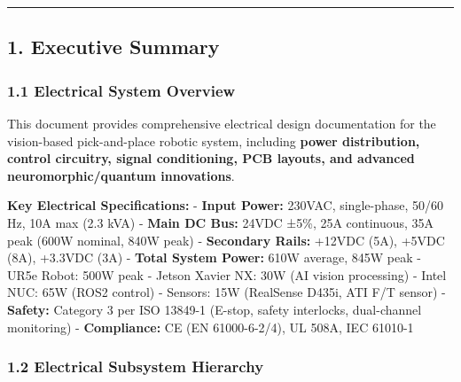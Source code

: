 \documentclass[
]{article}
\begin{document}
\begin{center}\rule{0.5\linewidth}{0.5pt}\end{center}

\hypertarget{executive-summary}{%
\subsection{1. Executive Summary}\label{executive-summary}}

\hypertarget{electrical-system-overview}{%
\subsubsection{1.1 Electrical System
Overview}\label{electrical-system-overview}}

This document provides comprehensive electrical design documentation for
the vision-based pick-and-place robotic system, including \textbf{power
distribution, control circuitry, signal conditioning, PCB layouts, and
advanced neuromorphic/quantum innovations}.

\textbf{Key Electrical Specifications:} - \textbf{Input Power:} 230VAC,
single-phase, 50/60 Hz, 10A max (2.3 kVA) - \textbf{Main DC Bus:} 24VDC
±5\%, 25A continuous, 35A peak (600W nominal, 840W peak) -
\textbf{Secondary Rails:} +12VDC (5A), +5VDC (8A), +3.3VDC (3A) -
\textbf{Total System Power:} 610W average, 845W peak - UR5e Robot: 500W
peak - Jetson Xavier NX: 30W (AI vision processing) - Intel NUC: 65W
(ROS2 control) - Sensors: 15W (RealSense D435i, ATI F/T sensor) -
\textbf{Safety:} Category 3 per ISO 13849-1 (E-stop, safety interlocks,
dual-channel monitoring) - \textbf{Compliance:} CE (EN 61000-6-2/4), UL
508A, IEC 61010-1

\hypertarget{electrical-subsystem-hierarchy}{%
\subsubsection{1.2 Electrical Subsystem
Hierarchy}\label{electrical-subsystem-hierarchy}}
\end{document}
